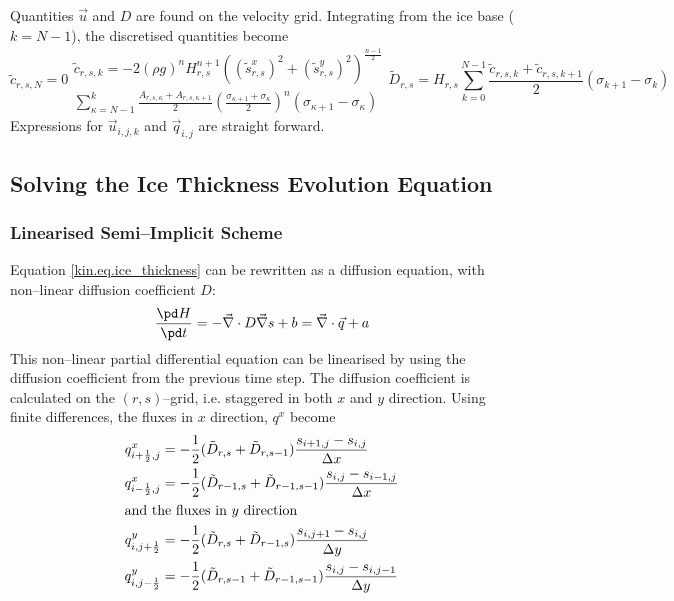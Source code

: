 Quantities $\vec u$ and $D$ are found on the velocity grid. Integrating from the ice base ($k=N-1$), the discretised quantities become
\begin{subequations}
  \begin{equation}
    \tilde{c}_{r,s,N}=0
  \end{equation}
  \begin{multline}
    \tilde{c}_{r,s,k}=-2(\rho g)^nH_{r,s}^{n+1}\left(({\tilde{s}^x_{r,s}})^2+({\tilde{s}^y_{r,s}})^2\right)^{\frac{n-1}{2}}\\
    \sum_{\kappa=N-1}^k\frac{A_{r,s,\kappa}+A_{r,s,\kappa+1}}2 \left(\frac{\sigma_{\kappa+1}+\sigma_\kappa}2\right)^n(\sigma_{\kappa+1}-\sigma_\kappa)
  \end{multline}
  \begin{equation}
    \tilde{D}_{r,s}=H_{r,s}\sum_{k=0}^{N-1}\frac{\tilde{c}_{r,s,k}+\tilde{c}_{r,s,k+1}}2(\sigma_{k+1}-\sigma_k)
  \end{equation}
\end{subequations}
Expressions for $\vec{u}_{i,j,k}$ and $\vec{q}_{i,j}$ are straight forward.

\subsection{Solving the Ice Thickness Evolution Equation}
\subsubsection{Linearised Semi--Implicit Scheme}
Equation \eqref{kin.eq.ice_thickness} can be rewritten as a diffusion equation, with non--linear diffusion coefficient $D$:
\begin{equation}
  \label{kin.eq.ice_evo}
  \frac{\pd H}{\pd t}=-\vec\nabla\cdot D\vec\nabla s+b=\vec\nabla\cdot\vec q+a
\end{equation}
This non--linear partial differential equation can be linearised by using the diffusion coefficient from the previous time step. The diffusion coefficient is calculated on the $(r,s)$--grid, i.e. staggered in both $x$ and $y$ direction. Using finite differences, the fluxes in $x$ direction, $q^x$ become
\begin{subequations}
\begin{align}
  q^x_{i+\frac12,j}&=-\frac12(\tilde{D}_{r,s}+\tilde{D}_{r,s-1})\frac{s_{i+1,j}-s_{i,j}}{\Delta x}\\
  q^x_{i-\frac12,j}&=-\frac12(\tilde{D}_{r-1,s}+\tilde{D}_{r-1,s-1})\frac{s_{i,j}-s_{i-1,j}}{\Delta x}\\
  \intertext{and the fluxes in $y$ direction}
  q^y_{i,j+\frac12}&=-\frac12(\tilde{D}_{r,s}+\tilde{D}_{r-1,s})\frac{s_{i,j+1}-s_{i,j}}{\Delta y}\\
  q^y_{i,j-\frac12}&=-\frac12(\tilde{D}_{r,s-1}+\tilde{D}_{r-1,s-1})\frac{s_{i,j}-s_{i,j-1}}{\Delta y}
\end{align}  
\end{subequations}

